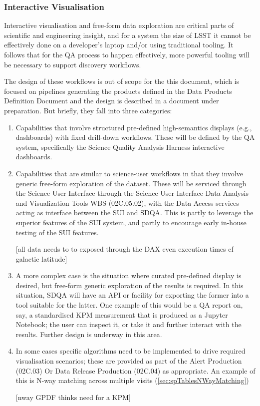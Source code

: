 \subsubsection{Interactive Visualisation}
\label{sec:qaInteractiveVis}

Interactive visualisation and free-form data exploration are critical parts of scientific and engineering insight, and for a system the size of LSST it cannot be effectively done on a developer's laptop and/or using traditional tooling. It follows that for the QA process to happen effectively, more powerful tooling will be necessary to support discovery workflows.

The design of these workflows is out of scope for the this document, which is focused on pipelines generating the products defined in the Data Products Definition Document and the design is described in a document under preparation. But briefly, they fall into three categories:

\begin{enumerate}

\item Capabilities that involve structured pre-defined high-semantics displays (e.g., dashboards) with fixed drill-down workflows. These will be defined by the QA system, specifically the Science Quality Analysis Harness interactive dashboards.

\item Capabilities that are similar to science-user workflows in that they involve generic free-form exploration of the dataset. These will be serviced through the Science User Interface through the Science User Interface Data Analysis and Visualization Tools WBS (02C.05.02), with the Data Access services acting as interface between the SUI and SDQA. This is partly to leverage the superior features of the SUI system, and partly to encourage early in-house testing of the SUI features.

[all data needs to to exposed through the DAX even execution times cf galactic latitude]

\item A more complex case is the situation where curated pre-defined display is desired, but free-form generic exploration of the results is required. In this situation, SDQA will have an API or facility for exporting the former into a tool suitable for the latter. One example of this would be a QA report on, say, a standardised KPM measurement that is produced as a Jupyter Notebook; the user can inspect it, or take it and further interact with the results. Further design is underway in this area.

\item In some cases specific algorithms need to be implemented to drive required visualisation scenarios; these are provided as part of the Alert Production (02C.03) Or Data Release Production (02C.04) as appropriate. An example of this is N-way matching across multiple visits (\ref{sec:spTablesNWayMatching})

[nway GPDF thinks need for a KPM]

\end{enumerate}

